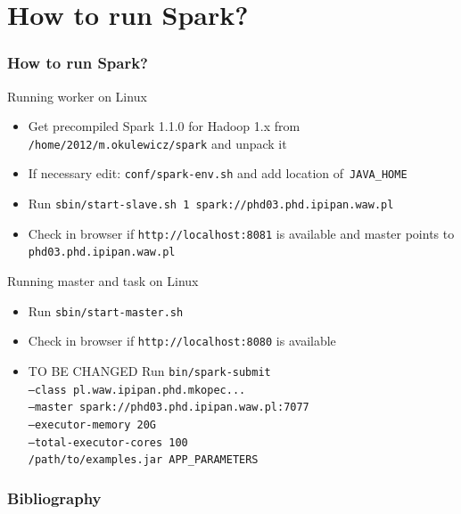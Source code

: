 \documentclass{beamer}
\begin{document}
\section{How to run Spark?}
\begin{frame}[allowframebreaks]
\frametitle{How to run Spark?}
\begin{block}{Running worker on Linux}
	\begin{itemize}
		\item Get precompiled Spark 1.1.0 for Hadoop 1.x from \texttt{/home/2012/m.okulewicz/spark} and unpack it
		\item If necessary edit: \texttt{conf/spark-env.sh} and add location of~\texttt{JAVA\_HOME}
		\item Run \texttt{sbin/start-slave.sh 1 spark://phd03.phd.ipipan.waw.pl}
		\item Check in browser if \texttt{http://localhost:8081} is available and master points to \texttt{phd03.phd.ipipan.waw.pl}
	\end{itemize}
	\end{block}
	\begin{block}{Running master and task on Linux}
	\begin{itemize}
		\item Run \texttt{sbin/start-master.sh}
		\item Check in browser if \texttt{http://localhost:8080} is available
		\item \color{red}TO BE CHANGED Run \texttt{bin/spark-submit \\
  --class pl.waw.ipipan.phd.mkopec... \\
  --master spark://phd03.phd.ipipan.waw.pl:7077 \\
  --executor-memory 20G \\
  --total-executor-cores 100 \\
  /path/to/examples.jar APP\_PARAMETERS}
	\end{itemize}
	\end{block}

\end{frame}

\begin{frame}[allowframebreaks]
	\frametitle<presentation>{Bibliography}
	\nocite{*}
	
	\tiny
	
\end{frame}
\end{document}
